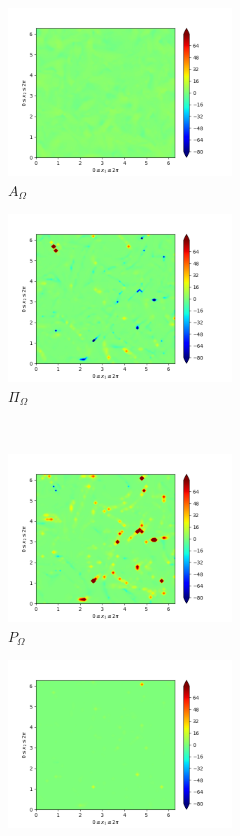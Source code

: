 \begin{figure}[H]
\begin{subfigure}{0.45\textwidth}
        \includegraphics[height=1.75in]{media/run-cds-65/A-enst-1335.png}
        \caption{$A_{\Omega}$}
    \end{subfigure}
    \newline
    \begin{subfigure}{0.45\textwidth}
        \includegraphics[height=1.75in]{media/run-cds-65/Pi-enst-1335.png}
        \caption{$\Pi_{\Omega}$}
    \end{subfigure}
    ~
    \begin{subfigure}{0.45\textwidth}
        \includegraphics[height=1.75in]{media/run-cds-65/P-enst-1335.png}
        \caption{$P_{\Omega}$}
    \end{subfigure}
    \newline
    \begin{subfigure}{0.45\textwidth}
        \includegraphics[height=1.75in]{media/run-cds-65/B-enst-1335.png}

\end{subfigure}
\end{figure}
